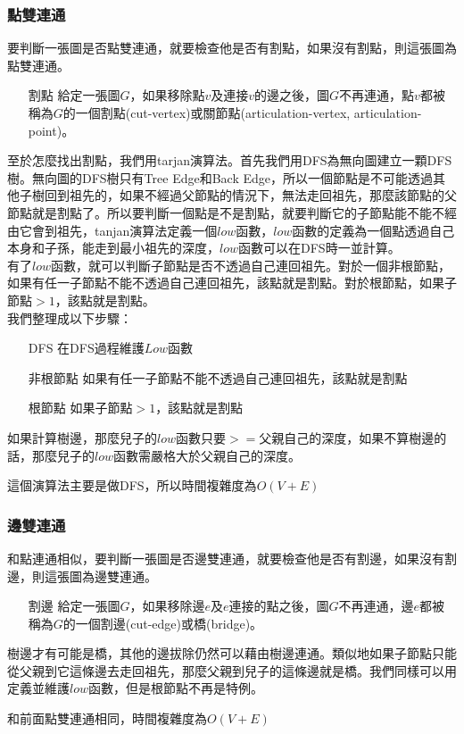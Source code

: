 \subsubsection{點雙連通}
要判斷一張圖是否點雙連通，就要檢查他是否有割點，如果沒有割點，則這張圖為點雙連通。
\begin{enumerate}
\item [割點] 給定一張圖$G$，如果移除點$v$及連接$v$的邊之後，圖$G$不再連通，點$v$都被稱為$G$的一個割點(cut-vertex)或關節點(articulation-vertex, articulation-point)。
\end{enumerate}
至於怎麼找出割點，我們用tarjan演算法。首先我們用DFS為無向圖建立一顆DFS樹。無向圖的DFS樹只有Tree Edge和Back Edge，所以一個節點是不可能透過其他子樹回到祖先的，如果不經過父節點的情況下，無法走回祖先，那麼該節點的父節點就是割點了。所以要判斷一個點是不是割點，就要判斷它的子節點能不能不經由它會到祖先，tanjan演算法定義一個$low$函數，$low$函數的定義為一個點透過自己本身和子孫，能走到最小祖先的深度，$low$函數可以在DFS時一並計算。\\
有了$low$函數，就可以判斷子節點是否不透過自己連回祖先。對於一個非根節點，如果有任一子節點不能不透過自己連回祖先，該點就是割點。對於根節點，如果子節點$>1$，該點就是割點。\\
我們整理成以下步驟：
\begin{enumerate}
\item [DFS] 在DFS過程維護$Low$函數
\item [非根節點] 如果有任一子節點不能不透過自己連回祖先，該點就是割點
\item [根節點] 如果子節點$>1$，該點就是割點
\end{enumerate}
如果計算樹邊，那麼兒子的$low$函數只要$>=$父親自己的深度，如果不算樹邊的話，那麼兒子的$low$函數需嚴格大於父親自己的深度。

這個演算法主要是做DFS，所以時間複雜度為$O(V+E)$
\subsubsection{邊雙連通}
和點連通相似，要判斷一張圖是否邊雙連通，就要檢查他是否有割邊，如果沒有割邊，則這張圖為邊雙連通。
\begin{enumerate}
\item [割邊] 給定一張圖$G$，如果移除邊$e$及$e$連接的點之後，圖$G$不再連通，邊$e$都被稱為$G$的一個割邊(cut-edge)或橋(bridge)。
\end{enumerate}
樹邊才有可能是橋，其他的邊拔除仍然可以藉由樹邊連通。類似地如果子節點只能從父親到它這條邊去走回祖先，那麼父親到兒子的這條邊就是橋。我們同樣可以用定義並維護$low$函數，但是根節點不再是特例。

和前面點雙連通相同，時間複雜度為$O(V+E)$
